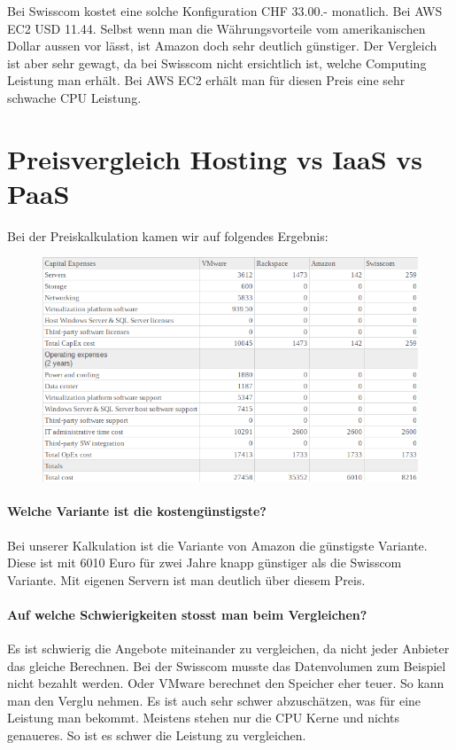 Bei Swisscom kostet eine solche Konfiguration CHF 33.00.- monatlich. Bei AWS EC2 USD 11.44. Selbst wenn man die Währungsvorteile vom amerikanischen Dollar aussen vor lässt, ist Amazon doch sehr deutlich günstiger. Der Vergleich ist aber sehr gewagt, da bei Swisscom nicht ersichtlich ist, welche Computing Leistung man erhält. Bei AWS EC2 erhält man für diesen Preis eine sehr schwache CPU Leistung.

\chapter{Preisvergleich Hosting vs IaaS vs PaaS}
Bei der Preiskalkulation kamen wir auf folgendes Ergebnis:
\begin{figure}[H]
\centering
\includegraphics[scale=0.65]{images/kostenvergleich.png}  
\end{figure}
\subsubsection{Welche Variante ist die kostengünstigste?}
Bei unserer Kalkulation ist die Variante von Amazon die günstigste Variante. Diese ist mit 6010 Euro für zwei Jahre knapp günstiger als die Swisscom Variante. Mit eigenen Servern ist man deutlich über diesem Preis.
\subsubsection{Auf welche Schwierigkeiten stosst man beim Vergleichen?}
Es ist schwierig die Angebote miteinander zu vergleichen, da nicht jeder Anbieter das gleiche Berechnen. Bei der Swisscom musste das Datenvolumen zum Beispiel nicht bezahlt werden. Oder VMware berechnet den Speicher eher teuer. So kann man den Verglu nehmen.
Es ist auch sehr schwer abzuschätzen, was für eine Leistung man bekommt. Meistens stehen nur die CPU Kerne und nichts genaueres. So ist es schwer die Leistung zu vergleichen.

